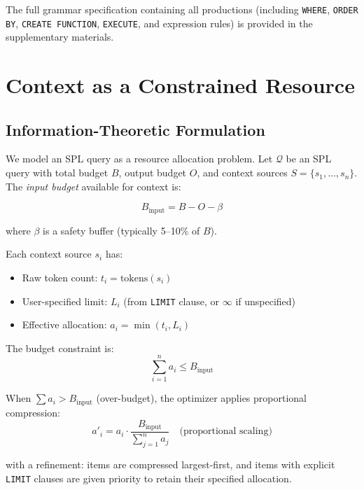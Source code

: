 \documentclass[11pt,a4paper]{article}
\begin{document}
The full grammar specification containing all productions (including \texttt{WHERE}, \texttt{ORDER BY}, \texttt{CREATE FUNCTION}, \texttt{EXECUTE}, and expression rules) is provided in the supplementary materials.

\section{Context as a Constrained Resource}
\label{sec:context-resource}

\subsection{Information-Theoretic Formulation}

We model an SPL query as a resource allocation problem. Let $\mathcal{Q}$ be an SPL query with total budget $B$, output budget $O$, and context sources $S = \{s_1, \ldots, s_n\}$. The \emph{input budget} available for context is:

\begin{equation}
B_{\text{input}} = B - O - \beta
\end{equation}

where $\beta$ is a safety buffer (typically 5--10\% of $B$).

Each context source $s_i$ has:
\begin{itemize}[nosep]
  \item Raw token count: $t_i = \text{tokens}(s_i)$
  \item User-specified limit: $L_i$ (from \texttt{LIMIT} clause, or $\infty$ if unspecified)
  \item Effective allocation: $a_i = \min(t_i, L_i)$
\end{itemize}

The budget constraint is:
\begin{equation}
\sum_{i=1}^{n} a_i \leq B_{\text{input}}
\end{equation}

When $\sum a_i > B_{\text{input}}$ (over-budget), the optimizer applies proportional compression:
\begin{equation}
a'_i = a_i \cdot \frac{B_{\text{input}}}{\sum_{j=1}^{n} a_j} \quad \text{(proportional scaling)}
\end{equation}

with a refinement: items are compressed largest-first, and items with explicit \texttt{LIMIT} clauses are given priority to retain their specified allocation.
\end{document}
